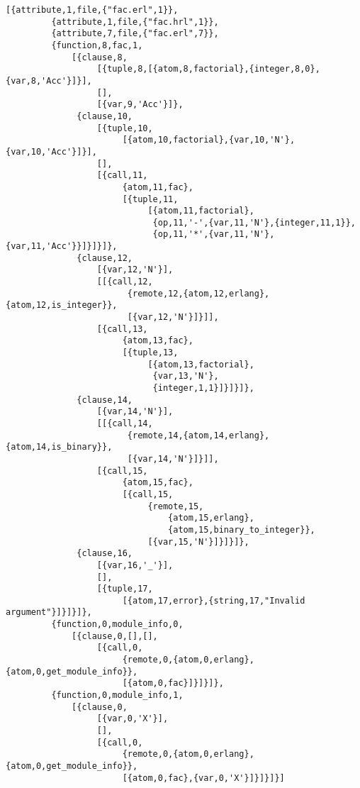 \begin{lstlisting}[style=erlang, caption=Drzewo składniowe modułu fac, label=lis:facAE]
[{attribute,1,file,{"fac.erl",1}},
         {attribute,1,file,{"fac.hrl",1}},
         {attribute,7,file,{"fac.erl",7}},
         {function,8,fac,1,
             [{clause,8,
                  [{tuple,8,[{atom,8,factorial},{integer,8,0},{var,8,'Acc'}]}],
                  [],
                  [{var,9,'Acc'}]},
              {clause,10,
                  [{tuple,10,
                       [{atom,10,factorial},{var,10,'N'},{var,10,'Acc'}]}],
                  [],
                  [{call,11,
                       {atom,11,fac},
                       [{tuple,11,
                            [{atom,11,factorial},
                             {op,11,'-',{var,11,'N'},{integer,11,1}},
                             {op,11,'*',{var,11,'N'},{var,11,'Acc'}}]}]}]},
              {clause,12,
                  [{var,12,'N'}],
                  [[{call,12,
                        {remote,12,{atom,12,erlang},{atom,12,is_integer}},
                        [{var,12,'N'}]}]],
                  [{call,13,
                       {atom,13,fac},
                       [{tuple,13,
                            [{atom,13,factorial},
                             {var,13,'N'},
                             {integer,1,1}]}]}]},
              {clause,14,
                  [{var,14,'N'}],
                  [[{call,14,
                        {remote,14,{atom,14,erlang},{atom,14,is_binary}},
                        [{var,14,'N'}]}]],
                  [{call,15,
                       {atom,15,fac},
                       [{call,15,
                            {remote,15,
                                {atom,15,erlang},
                                {atom,15,binary_to_integer}},
                            [{var,15,'N'}]}]}]},
              {clause,16,
                  [{var,16,'_'}],
                  [],
                  [{tuple,17,
                       [{atom,17,error},{string,17,"Invalid argument"}]}]}]},
         {function,0,module_info,0,
             [{clause,0,[],[],
                  [{call,0,
                       {remote,0,{atom,0,erlang},{atom,0,get_module_info}},
                       [{atom,0,fac}]}]}]},
         {function,0,module_info,1,
             [{clause,0,
                  [{var,0,'X'}],
                  [],
                  [{call,0,
                       {remote,0,{atom,0,erlang},{atom,0,get_module_info}},
                       [{atom,0,fac},{var,0,'X'}]}]}]}]
\end{lstlisting}

